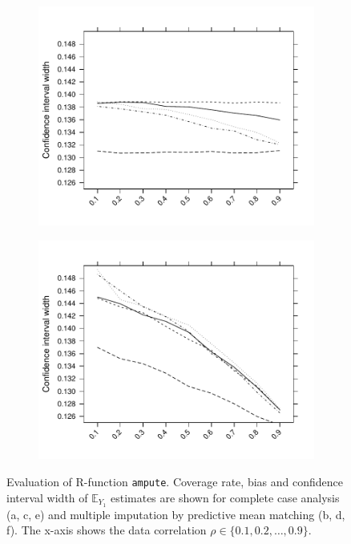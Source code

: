 \documentclass[11pt,a4paper]{article}
\newcommand{\code}[1]{\texttt{#1}}
\begin{document}
\begin{figure}[t!]
\begin{subfigure}{.51\textwidth}
\includegraphics[width = 1.0\linewidth]{Figures/Figure1e.pdf}
\vspace{-2.2\baselineskip}
\subcaption{}
\label{01e}
\end{subfigure}
\begin{subfigure}{.51\textwidth}
\includegraphics[width=1.0\linewidth]{Figures/Figure1f.pdf}
\vspace{-2.2\baselineskip}
\subcaption{}
\label{01f}
\end{subfigure}
{\caption{\normalsize Evaluation of R-function \code{ampute}. Coverage rate, bias and confidence interval width of $\mathbb{E}_{Y_1}$ estimates are shown for complete case analysis (a, c, e) and multiple imputation by predictive mean matching (b, d, f). The x-axis shows the data correlation $\rho \in \{0.1, 0.2, \dots, 0.9\}$.}
\label{sim1}}
\end{figure}
\end{document}
